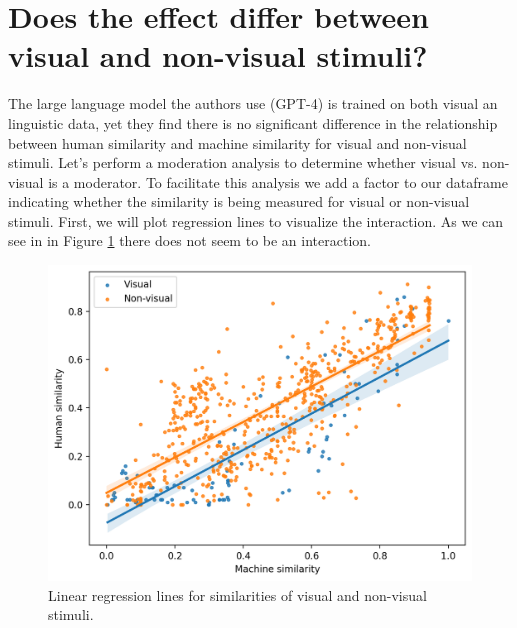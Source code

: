 \documentclass[man]{apa7}
\begin{document}



\section{Does the effect differ between visual and non-visual stimuli?}

The large language model the authors use (GPT-4) is trained on both visual an linguistic data, yet they find there is no significant difference in the relationship between human similarity and machine similarity for visual and non-visual stimuli. Let's perform a moderation analysis to determine whether visual vs. non-visual is a moderator. To facilitate this analysis we add a factor to our dataframe indicating whether the similarity is being measured for visual or non-visual stimuli. First, we will plot regression lines to visualize the interaction. As we can see in in Figure \ref{fig:regplot2} there does not seem to be an interaction.

\begin{figure}
    \centering
    \includegraphics[width=\textwidth]{figures/regplot2.png}
    \caption{Linear regression lines for similarities of visual and non-visual stimuli.}
    \label{fig:regplot2}
\end{figure}
\end{document}
